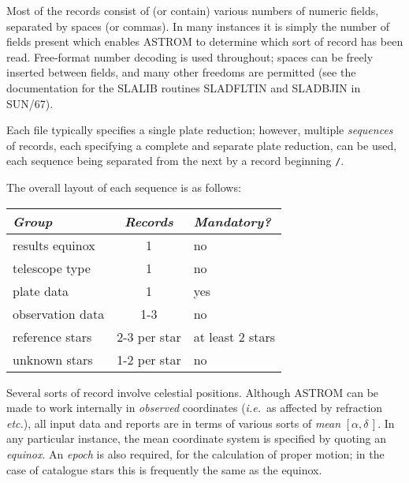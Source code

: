 \documentclass[twoside,11pt]{article}
\newcommand{\xref}[3]{#1}
\renewcommand{\_}{\texttt{\symbol{95}}}
\newcommand{\radec}     {$[\alpha,\delta\,]$}
\begin{document}
Most of the records consist of (or contain) various numbers of numeric
fields, separated by spaces (or commas).  In many instances it is
simply the number of fields present which enables ASTROM to determine
which sort of record has been read.  Free-format number decoding
is used throughout; spaces can be freely inserted between fields,
and many other freedoms are permitted (see the documentation for the
\xref{SLALIB}{sun67}{} routines \xref{SLA\_DFLTIN}{sun67}{SLA_DFLTIN}
and \xref{SLA\_DBJIN}{sun67}{SLA_DBJIN} in SUN/67).

Each file typically specifies a single plate reduction;  however,
multiple \textit{sequences} of records, each specifying a complete
and separate plate reduction, can be used, each sequence being separated
from the next by a record beginning \texttt{/}.


\goodbreak

The overall layout of each sequence is as follows:

\begin{center}
\begin{tabular}{|l|c|l|}
\hline
\textit{Group} & \textit{Records} & \textit{Mandatory?} \\
\hline
results equinox  &   1           & no \\
telescope type   &   1           & no \\
plate data       &   1           & yes \\
observation data &   1-3         & no \\
reference stars  &  2-3 per star & at least 2 stars \\
unknown stars    &  1-2 per star & no \\
\hline
\end{tabular}
\end{center}

Several sorts of record involve celestial positions.  Although ASTROM
can be made to work internally in \textit{observed} coordinates
(\emph{i.e.}\ as affected by refraction \emph{etc.}), all input data
and reports are in terms of various sorts of \textit{mean} \radec.
In any particular instance, the mean coordinate system is specified
by quoting an \textit{equinox}.  An \textit{epoch} is also required,
for the calculation of proper motion;  in the case of catalogue stars
this is frequently the same as the equinox.
\end{document}

